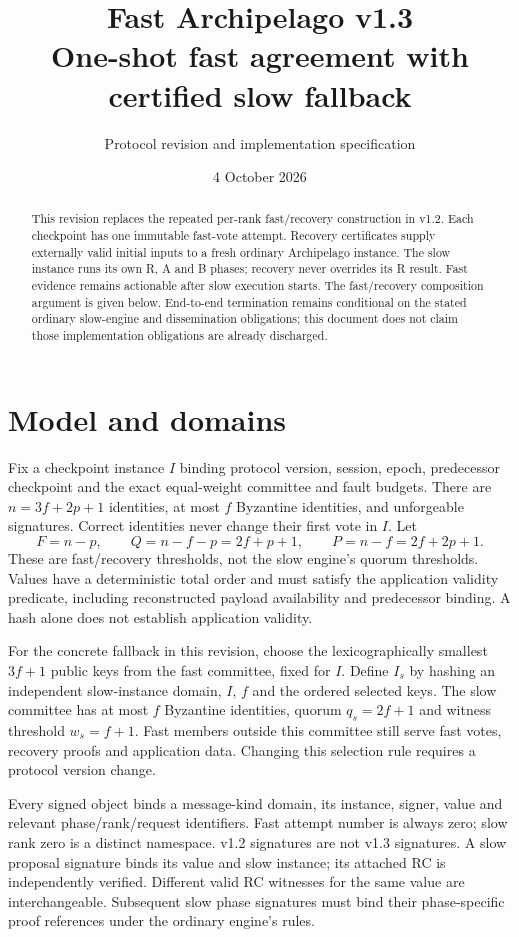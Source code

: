 \documentclass[11pt]{article}
\title{Fast Archipelago v1.3\\One-shot fast agreement with certified slow fallback}
\author{Protocol revision and implementation specification}
\date{4 October 2026}
\begin{document}
\maketitle
\begin{abstract}
This revision replaces the repeated per-rank fast/recovery construction in v1.2.
Each checkpoint has one immutable fast-vote attempt. Recovery certificates
supply externally valid initial inputs to a fresh ordinary Archipelago instance.
The slow instance runs its own R, A and B phases; recovery never overrides its
R result. Fast evidence remains actionable after slow execution starts.
The fast/recovery composition argument is given below. End-to-end termination
remains conditional on the stated ordinary slow-engine and dissemination
obligations; this document does not claim those implementation obligations are
already discharged.
\end{abstract}

\section{Model and domains}
Fix a checkpoint instance $I$ binding protocol version, session, epoch,
predecessor checkpoint and the exact equal-weight committee and fault budgets.
There are $n=3f+2p+1$ identities, at most $f$ Byzantine identities, and
unforgeable signatures. Correct identities never change their first vote in $I$.
Let
\[
 F=n-p,\qquad Q=n-f-p=2f+p+1,\qquad P=n-f=2f+2p+1.
\]
These are fast/recovery thresholds, not the slow engine's quorum thresholds.
Values have a deterministic total order and must satisfy the application validity
predicate, including reconstructed payload availability and predecessor binding.
A hash alone does not establish application validity.

For the concrete fallback in this revision, choose the lexicographically smallest
$3f+1$ public keys from the fast committee, fixed for $I$. Define $I_s$ by hashing
an independent slow-instance domain, $I$, $f$ and the ordered selected keys.
The slow committee has at most $f$ Byzantine identities, quorum $q_s=2f+1$
and witness threshold $w_s=f+1$. Fast members outside this committee still
serve fast votes, recovery proofs and application data. Changing this selection
rule requires a protocol version change.

Every signed object binds a message-kind domain, its instance, signer, value
and relevant phase/rank/request identifiers. Fast attempt number is always zero;
slow rank zero is a distinct namespace. v1.2 signatures are not v1.3 signatures.
A slow proposal signature binds its value and slow instance; its attached RC
is independently verified. Different valid RC witnesses for the same value are
interchangeable. Subsequent slow phase signatures must bind their phase-specific
proof references under the ordinary engine's rules.
\end{document}
